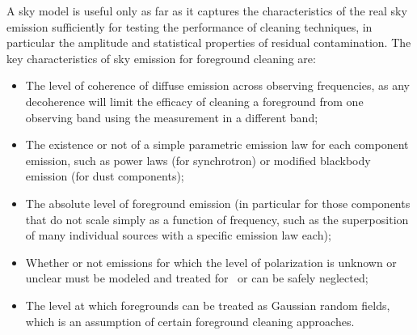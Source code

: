 A sky model is useful only as far as it captures the characteristics of the real sky emission sufficiently for testing the performance of cleaning techniques, in particular the amplitude and statistical properties of residual contamination.
The key characteristics of sky emission for foreground cleaning are:
\begin{itemize}
\item The level of coherence of diffuse emission across observing frequencies, as any decoherence will limit the efficacy of cleaning a foreground from one observing band using the measurement in a different band;
\item The existence or not of a simple parametric emission law for each component emission, such as power laws (for synchrotron) or modified blackbody emission (for dust components);
\item The absolute level of foreground emission (in particular for those components that do not scale simply as a function of frequency, such as the superposition of many individual sources with a specific emission law each);
\item Whether or not emissions for which the level of polarization is unknown or unclear 
must be modeled and treated for \cmbexp\ or can be safely neglected;
\item The level at which foregrounds can be treated as Gaussian random fields, which is an assumption of certain foreground cleaning approaches.
\end{itemize} 


